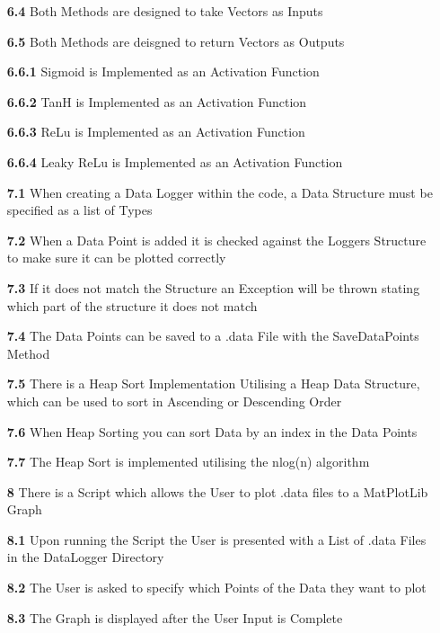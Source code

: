 \begin{flushleft}
\begin{itemize}
            \item[\textbf{6.4}] Both Methods are designed to take Vectors as Inputs
            \item[\textbf{6.5}] Both Methods are deisgned to return Vectors as Outputs
            \item[\textbf{6.6.1}] Sigmoid is Implemented as an Activation Function
            \item[\textbf{6.6.2}] TanH is Implemented as an Activation Function
            \item[\textbf{6.6.3}] ReLu is Implemented as an Activation Function
            \item[\textbf{6.6.4}] Leaky ReLu is Implemented as an Activation Function
            \item[\textbf{7.1}] When creating a Data Logger within the code, a Data Structure must be specified as a list of Types
            \item[\textbf{7.2}] When a Data Point is added it is checked against the Loggers Structure to make sure it can be plotted correctly
            \item[\textbf{7.3}] If it does not match the Structure an Exception will be thrown stating which part of the structure it does not match
            \item[\textbf{7.4}] The Data Points can be saved to a .data File with the \textsf{SaveDataPoints} Method
            \item[\textbf{7.5}] There is a Heap Sort Implementation Utilising a Heap Data Structure, which can be used to sort in Ascending or Descending Order
            \item[\textbf{7.6}] When Heap Sorting you can sort Data by an index in the Data Points
            \item[\textbf{7.7}] The Heap Sort is implemented utilising the nlog(n) algorithm
            \item[\textbf{8}] There is a Script which allows the User to plot .data files to a MatPlotLib Graph
            \item[\textbf{8.1}] Upon running the Script the User is presented with a List of .data Files in the DataLogger Directory
            \item[\textbf{8.2}] The User is asked to specify which Points of the Data they want to plot
            \item[\textbf{8.3}] The Graph is displayed after the User Input is Complete
        \end{itemize}


\end{flushleft}

